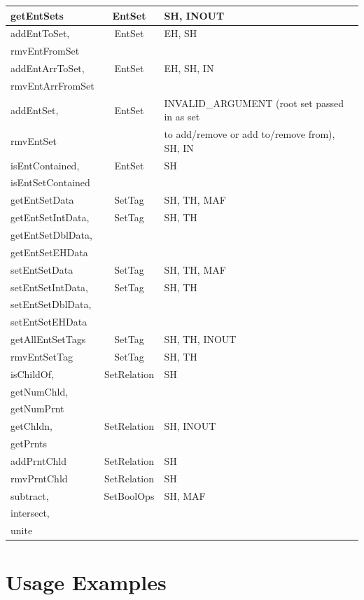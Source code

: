 \documentclass{article}
\begin{document}
\begin{longtable}{|l|c|p{3in}|}
getEntSets& EntSet& SH, INOUT\\
\hline

addEntToSet, & EntSet&EH, SH\\
rmvEntFromSet &&\\
\hline

addEntArrToSet,& EntSet& EH, SH, IN\\
rmvEntArrFromSet& &\\
\hline

addEntSet, & EntSet& INVALID\_ARGUMENT (root set passed in as set \\
rmvEntSet&&to add/remove or add to/remove from), SH, IN\\
\hline

isEntContained, & EntSet& SH\\
isEntSetContained& &\\
\hline

getEntSetData& SetTag& SH, TH, MAF\\
\hline

getEntSetIntData, & SetTag&SH, TH\\
getEntSetDblData,& &\\ 
getEntSetEHData& &\\
\hline

setEntSetData& SetTag& SH, TH, MAF\\
\hline

setEntSetIntData, & SetTag&SH, TH\\
setEntSetDblData, & &\\
setEntSetEHData& &\\
\hline

getAllEntSetTags& SetTag& SH, TH, INOUT\\
\hline

rmvEntSetTag& SetTag& SH, TH\\
\hline
isChildOf,& SetRelation &SH\\
getNumChld, & &\\
getNumPrnt&  &\\
\hline

getChldn,& SetRelation  &SH, INOUT\\
getPrnts& &\\ 
\hline

addPrntChld& SetRelation& SH\\
\hline

rmvPrntChld& SetRelation& SH\\
\hline

subtract, & SetBoolOps&SH, MAF\\
intersect, & &\\
unite& &\\  
\hline
\end{longtable}


\section{Usage Examples}
\end{document}
